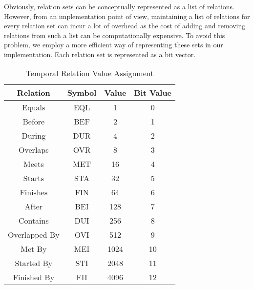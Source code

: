\documentclass[11pt]{report}
\begin{document}
          Obviously, relation sets can be conceptually represented as a list of
          relations. However, from an implementation point of view, maintaining
          a list of relations for every relation set can incur a lot of
          overhead as the cost of adding and removing relations from such a
          list can be computationally expensive. To avoid this problem, we
          employ a more efficient way of representing these sets in our
          implementation. Each relation set is represented as a bit
          vector\footnotemark.


          \begin{table}[tbhp]
            \begin{center}
              \begin{tabular}[t]{|c|c|c|c|}
                \hline
                {\bf Relation} & {\bf Symbol} & {\bf Value} & {\bf Bit Value} \\
                \hline
                Equals        & EQL &    1 &  0 \\
                \hline                        
                Before        & BEF &    2 &  1 \\
                \hline                        
                During        & DUR &    4 &  2 \\
                \hline                        
                Overlaps      & OVR &    8 &  3 \\
                \hline                        
                Meets         & MET &   16 &  4 \\
                \hline                        
                Starts        & STA &   32 &  5 \\
                \hline                        
                Finishes      & FIN &   64 &  6 \\
                \hline                        
                After         & BEI &  128 &  7 \\
                \hline                        
                Contains      & DUI &  256 &  8 \\
                \hline                        
                Overlapped By & OVI &  512 &  9 \\
                \hline
                Met By        & MEI & 1024 & 10 \\
                \hline
                Started By    & STI & 2048 & 11 \\
                \hline
                Finished By   & FII & 4096 & 12 \\
                \hline
              \end{tabular}
            \end{center}
            \caption[]{Temporal Relation Value Assignment}
            \label{table-rels-value}
          \end{table}
\end{document}
